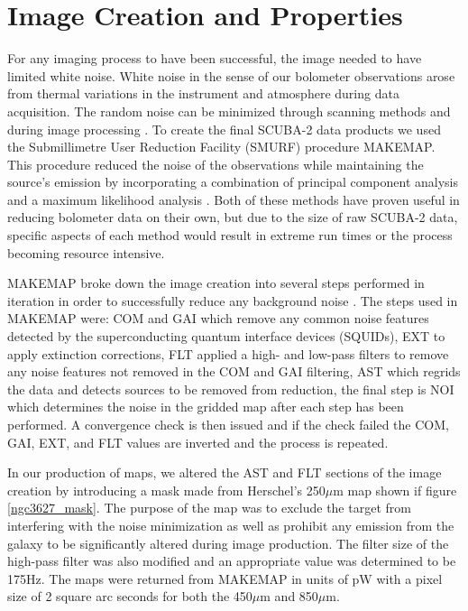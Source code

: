 \section{Image Creation and Properties}

For any imaging process to have been successful, the image needed to have limited white noise.  White noise in the sense of our bolometer observations arose from thermal variations in the instrument and atmosphere during data acquisition. The random noise can be minimized through scanning methods and during image processing \citet{chapin2013}.  To create the final SCUBA-2 data products we used the Submillimetre User Reduction Facility (SMURF) procedure MAKEMAP.  This procedure reduced the noise of the observations while maintaining the source's emission by incorporating a combination of principal component analysis and a maximum likelihood analysis \citet{chapin2013}.  Both of these methods have proven useful in reducing bolometer data on their own, but due to the size of raw SCUBA-2 data, specific aspects of each method would result in extreme run times or the process becoming resource intensive.

MAKEMAP broke down the image creation into several steps performed in iteration in order to successfully reduce any background noise \citet{chapin2013}.  The steps used in MAKEMAP were:  COM and GAI which remove any common noise features detected by the superconducting quantum interface devices (SQUIDs), EXT to apply extinction corrections, FLT applied  a high- and low-pass filters to remove any noise features not removed in the COM and GAI filtering, AST which regrids the data and detects sources to be removed from reduction, the final step is NOI which determines the noise in the gridded map after each step has been performed.  A convergence check is then issued and if the check failed the COM, GAI, EXT, and FLT values are inverted and the process is repeated.

In our production of maps, we altered the AST and FLT sections of the image creation by introducing a mask made from Herschel's 250$\mu$m map shown if figure \ref{ngc3627_mask}.  The purpose of the map was to exclude the target from interfering with the noise minimization as well as prohibit any emission from the galaxy to be significantly altered during image production.  The filter size of the high-pass filter was also modified and an appropriate value was determined to be 175Hz.  The maps were returned from MAKEMAP in units of pW with a pixel size of 2 square arc seconds for both the 450$\mu$m and 850$\mu$m.

